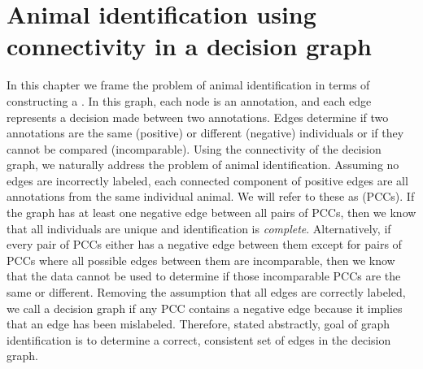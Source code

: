 \begin{comment}
fixtex --fpaths chapter5-graphid.tex --outline --asmarkdown --numlines=999 --shortcite

fixtex --fpaths chapter5-graphid.tex --outline --asmarkdown --numlines=999 --shortcite -w && ./checklang.py outline_chapter5-graphid.md

fixtex --fpaths chapter1-intro.tex --outline --asmarkdown --numlines=999 --shortcite -w && ./checklang.py outline_chapter1-intro.md
\end{comment}



\chapter{Animal identification using connectivity in a decision graph}\label{chap:graphid}
\newcommand{\nT}{N}

In this chapter we frame the problem of animal identification in terms of constructing a %
.
In this graph, each node is an annotation, and each edge represents a decision made between two annotations.
Edges determine if two annotations are the same (positive) or different (negative) individuals or if they cannot
  be compared (incomparable).
Using the connectivity of the decision graph, we naturally address the problem of animal identification.
Assuming no edges are incorrectly labeled, each connected component of positive edges are all annotations from
  the same individual animal.
We will refer to these as  (PCCs).
If the graph has at least one negative edge between all pairs of PCCs, then we know that all individuals are
  unique and identification is \emph{complete}.
Alternatively, if every pair of PCCs either has a negative edge between them except for pairs of PCCs where all
  possible edges between them are incomparable, then we know that the data cannot be used to determine if those
  incomparable PCCs are the same or different.
Removing the assumption that all edges are correctly labeled, we call a decision graph 
  if any PCC contains a negative edge because it implies that an edge has been mislabeled.
Therefore, stated abstractly, goal of graph identification is to determine a correct, consistent set of edges in
  the decision graph.


